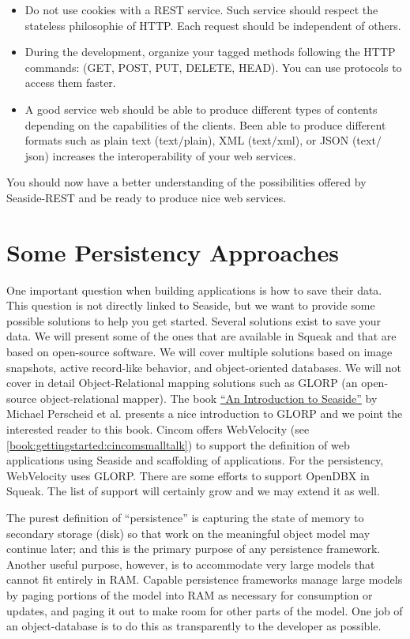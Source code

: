 \documentclass[a4paper,10pt,twoside]{book}
\begin{document}
\begin{itemize}
\item  Do not use cookies with a REST service. Such service should respect the stateless philosophie of HTTP. Each request should be independent of others. 
\item  During the development, organize your tagged methods following the HTTP commands: (GET, POST, PUT, DELETE, HEAD). You can use protocols to access them faster.
\item  A good service web should be able to produce different types of contents depending on the capabilities of the clients. Been able to produce different formats such as plain text (text$/$plain), XML (text$/$xml), or JSON (text$/$json) increases the interoperability of your web services.
\end{itemize}

You should now have a better understanding of the possibilities offered by Seaside-REST and be ready to produce nice web services.

\chapter{Some Persistency Approaches}
\label{book:advanced:persistency}

One important question when building applications is how to save their data. This question is not directly linked to Seaside, but we want to provide some possible solutions to help you get started. Several solutions exist to save your data. We will present some of the ones that are available in Squeak and that are based on open-source software. We will cover multiple solutions based on image snapshots, active record-like behavior, and object-oriented databases. We will not cover in detail Object-Relational mapping solutions such as GLORP (an open-source object-relational mapper). The book \href{http://www.swa.hpi.uni-potsdam.de/seaside/tutorial}{``An Introduction to Seaside''} by Michael Perscheid et al. presents a nice introduction to GLORP and we point the interested reader to this book. Cincom offers WebVelocity (see \autoref{book:gettingstarted:cincomsmalltalk}) to support the definition of web applications using Seaside and scaffolding of applications. For the persistency, WebVelocity uses GLORP. There are some efforts to support OpenDBX in Squeak. The list of support will certainly grow and we may extend it as well. 

The purest definition of ``persistence'' is capturing the state of memory to secondary storage (disk) so that work on the meaningful object model may continue later; and this is the primary purpose of any persistence framework.  Another useful purpose, however, is to accommodate very large models that cannot fit entirely in RAM. Capable persistence frameworks manage large models by paging portions of the model into RAM as necessary for consumption or updates, and paging it out to make room for other parts of the model.  One job of an object-database is to do this as transparently to the developer as possible.
\end{document}
